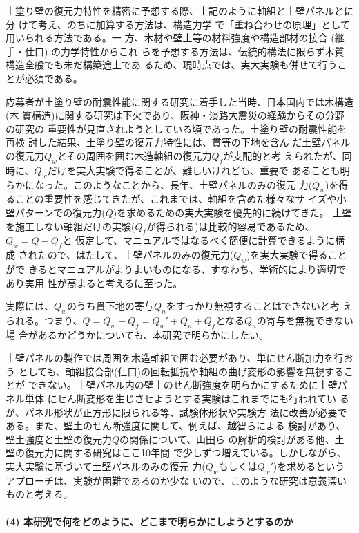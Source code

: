 \documentclass[11pt,a4paper,uplatex,dvipdfmx]{ujarticle} 		%
\newcommand{\研究課題名}{伝統的な木造土塗り壁の復元力に及ぼす軸組の影響に関する実験研究}
\newcommand{\研究機関名}{公立鳥取環境大学}
\newcommand{\研究代表者氏名}{中治弘行}
\newcommand{\私}{{\研究代表者氏名}}
\newcommand{\研究期間の最終元号年度}{8}  %
\begin{document}
土塗り壁の復元力特性を精密に予想する際、上記のように軸組と土壁パネルとに分
けて考え、のちに加算する方法\cite{kentouiinkai2012,manual2019}は、構造力学
で「重ね合わせの原理」として用いられる方法である。一
方、木材や壁土等の材料強度や構造部材の接合 (継手・仕口) の力学特性からこれ
らを予想する方法は、伝統的構法に限らず木質構造全般でも未だ構築途上であ
る\cite{miyamoto2015}ため、現時点では、実大実験も併せて行うことが必須である。

応募者が土塗り壁の耐震性能に関する研究に着手した当時、日本国内では木構造(木
質構造)に関する研究は下火であり、阪神・淡路大震災の経験からその分野の研究の
重要性が見直されようとしている頃であった。土塗り壁の耐震性能を再検
討\cite{tuchikabe1999}した結果、土塗り壁の復元力特性には、貫等の下地を含ん
だ土壁パネルの復元力$Q_w$とその周囲を囲む木造軸組の復元力$Q_f$が支配的と考
えられたが、同時に、$Q_w$だけを実大実験で得ることが、難しいけれども、重要で
あることも明らかになった。このようなことから、長年、土壁パネルのみの復元
力($Q_w$)を得ることの重要性を感じてきたが、これまでは、軸組を含めた様々なサ
イズや小壁パターンでの復元力($Q$)を求めるための実大実験を優先的に続けてきた。
土壁を施工しない軸組だけの実験($Q_f$が得られる)は比較的容易であるため、$Q_w=Q-Q_f$と
仮定して、マニュアル\cite{manual2019}ではなるべく簡便に計算できるように構成
されたので、はたして、土壁パネルのみの復元力($Q_w$)を実大実験で得ることがで
きるとマニュアルがよりよいものになる、すなわち、学術的により適切であり実用
性が高まると考えるに至った。

実際には、$Q_w$のうち貫下地の寄与$Q_n$をすっかり無視することはできないと考
えられる。つまり、$Q=Q_w+Q_f=Q_w'+Q_n+Q_f$となる$Q_n$の寄与を無視できない場
合があるかどうかについても、本研究で明らかにしたい。

土壁パネルの製作では周囲を木造軸組で囲む必要があり、単にせん断加力を行おう
としても、軸組接合部(仕口)の回転抵抗や軸組の曲げ変形の影響を無視することが
できない。土壁パネル内の壁土のせん断強度を明らかにするために土壁パネル単体
にせん断変形を生じさせようとする実験はこれまでにも行われてい
る\cite{fukumoto2000}が、パネル形状が正方形に限られる等、試験体形状や実験方
法に改善が必要である。また、壁土のせん断強度に関して、例えば、越智らによる
検討\cite{ochi2019}があり、壁土強度と土壁の復元力$Q$の関係について、山田ら
の解析的検討\cite{yamada2011}がある他、土壁の復元力に関する研究はここ10年間
で少しずつ増えている。しかしながら、実大実験に基づいて土壁パネルのみの復元
力($Q_w$もしくは$Q_w'$)を求めるというアプローチは、実験が困難であるのか少な
いので、このような研究は意義深いものと考える。

\paragraph{(4) 本研究で何をどのように、どこまで明らかにしようとするのか}
\mbox{}\par
\end{document}
